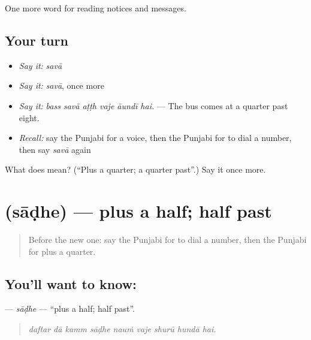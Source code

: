 \begin{grammarlens}[title={What you've built}]
One more word for reading notices and messages.
\end{grammarlens}

\subsection*{Your turn}
\begin{itemize}
\raggedright
  \item \emph{Say it:} \emph{savā}
  \item \emph{Say it:} \emph{savā}, once more
  \item \emph{Say it:} \emph{bass savā aṭṭh vaje āundī hai.} — The bus comes at a quarter past eight.
  \item \emph{Recall:} say the Punjabi for a voice, then the Punjabi for to dial a number, then say \emph{savā} again
\end{itemize}

\begin{tcolorbox}[breakable,colback=teal!4,colframe=teal!35!black,title={Before you move on}]
What does  mean? (\textquotedblleft{}Plus a quarter; a quarter past\textquotedblright{}.) Say it once more.
\end{tcolorbox}
\section[\texorpdfstring{\pa{ਸਾਢੇ} (sāḍhe)}{ਸਾਢੇ (sāḍhe)}]{ (sāḍhe) — plus a half; half past}

\label{lesson:PA-C260-sadhe}



\begin{quote}
Before the new one: say the Punjabi for to dial a number, then the Punjabi for plus a quarter.
\end{quote}

\subsection*{You'll want to know: }
\textbf{} — \emph{sāḍhe} — \textquotedblleft{}plus a half; half past\textquotedblright{}.

\begin{quote}
        
\end{quote}

\begin{quote}
\emph{daftar dā kamm sāḍhe nauṁ vaje shurū hundā hai.}
\end{quote}

